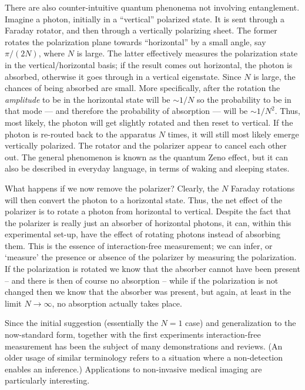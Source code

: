 \documentclass[12pt,aps,prb,preprint]{revtex4}
\begin{document}
There are also counter-intuitive quantum phenonema not involving
entanglement.  Imagine a photon, initially in a ``vertical'' polarized
state.  It is sent through a Faraday rotator, and then through a
vertically polarizing sheet.  The former rotates the polarization
plane towards ``horizontal'' by a small angle, say $\pi/(2N)$, where
$N$ is large.  The latter effectively measures the polarization state
in the vertical/horizontal basis; if the result comes out horizontal,
the photon is absorbed, otherwise it goes through in a vertical
eigenstate.  Since $N$ is large, the chances of being absorbed are
small.  More specifically, after the rotation the {\em amplitude\/} to
be in the horizontal state will be $\sim1/N$ so the probability to be
in that mode --- and therefore the probability of absorption --- will
be $\sim1/N^2$.  Thus, most likely, the photon will get slightly
rotated and then reset to vertical.  If the photon is re-routed back
to the apparatus $N$ times, it will still most likely emerge
vertically polarized.  The rotator and the polarizer appear to cancel
each other out.  The general phenomenon is known as the quantum Zeno
effect,\cite{PhysRevA.41.2295} but it can also be described in
everyday language, in terms of waking and sleeping
states.\cite{orzel2009teach}

What happens if we now remove the polarizer?  Clearly, the $N$ Faraday
rotations will then convert the photon to a horizontal state.  Thus,
the net effect of the polarizer is to rotate a photon from horizontal
to vertical.  Despite the fact that the polarizer is really just an
absorber of horizontal photons, it can, within this experimental
set-up, have the effect of rotating photons instead of absorbing them.
This is the essence of interaction-free measurement; we can infer, or
`measure' the presence or absence of the polarizer by measuring the
polarization.  If the polarization is rotated we know that the
absorber cannot have been present -- and there is then of course no
absorption -- while if the polarization is not changed then we know
that the absorber was present, but again, at least in the limit $N
\rightarrow \infty$, no absorption actually takes place.

Since the initial suggestion (essentially the $N=1$
case)\cite{1993FoPh...23..987E} and generalization to the now-standard
form, together with the first experiments\cite{PhysRevLett.74.4763}
interaction-free measurement has been the subject of many
demonstrations\cite{PhysRevA.57.3987,voorthuysen:1504,2006JPhB...39.3177N}
and reviews.\cite{deweerd:272} (An older usage of similar
terminology\cite{springerlink:10.1007/BF01327019,dicke:925} refers to
a situation where a non-detection enables an inference.)  Applications
to non-invasive medical imaging\cite{PhysRevA.80.040902} are
particularly interesting.
\end{document}
